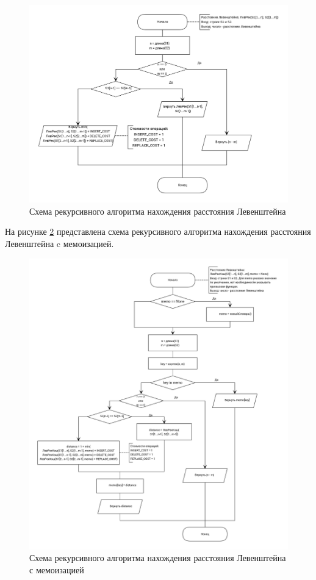 \begin{figure}[!htb]
\centering
\includegraphics[width=\textwidth]{img/recursive_levenshtein.png}
\caption{Схема рекурсивного алгоритма нахождения расстояния \newline Левенштейна}
\label{fig:recur_lev}
\end{figure}

На рисунке \ref{fig:recur_lev_cache} представлена схема рекурсивного алгоритма нахождения расстояния Левенштейна c мемоизацией.

\begin{figure}[!htb]
\centering
\includegraphics[width=\textwidth]{img/recursive_cache_levenshtein.png}
\caption{Схема рекурсивного алгоритма нахождения расстояния Левенштейна с мемоизацией}
\label{fig:recur_lev_cache}
\end{figure}

